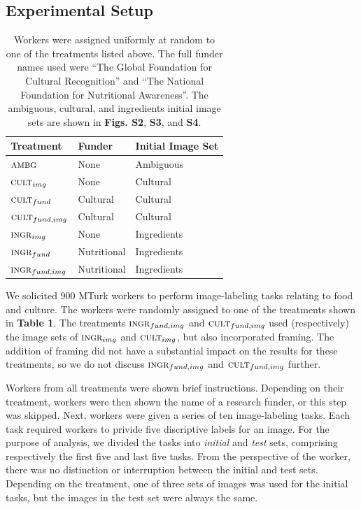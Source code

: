 \documentclass[letterpaper]{article}
\begin{document}
\subsection*{Experimental Setup}
\begin{table}[t]
\centering
	\begin{tabular}{ l  l  l }
		\hline                       
		Treatment & Funder & Initial Image Set	\\ 
		\hline                       
		$\textsc{ambg}$ & None & Ambiguous\\
		$\textsc{cult}_{img}$ & None & Cultural\\
		$\textsc{cult}_{fund}$ & Cultural & Cultural\\
		$\textsc{cult}_{fund,img}$ & Cultural & Cultural\\
		$\textsc{ingr}_{img}$ & None & Ingredients\\
		$\textsc{ingr}_{fund}$ & Nutritional & Ingredients\\
		$\textsc{ingr}_{fund, img}$ & Nutritional & Ingredients\\
		\hline  
	\end{tabular}

	\caption{ \footnotesize{ 
		Workers were assigned uniformly at random to one of the 
		treatments listed above. 
		The full funder names used were 
		``The Global Foundation for Cultural Recognition'' and 
		``The National Foundation for Nutritional Awareness''.  
		The ambiguous, cultural, and ingredients initial image sets are shown 
		in \textbf{Figs. S2}, \textbf{S3}, and \textbf{S4}.
	}}
	\label{table:1}
\end{table}
We solicited 900 MTurk workers to perform image-labeling tasks relating to
food and culture.  The workers were randomly assigned to one of the treatments
shown in \textbf{Table 1}.  The treatments $\textsc{ingr}_{fund,img}$ and 
$\textsc{cult}_{fund,img}$ used (respectively) the image sets of 
$\textsc{ingr}_{img}$ and $\textsc{cult}_{img}$, but also 
incorporated framing.  The addition of framing did not have a substantial
impact on the results for these treatments, so we do not discuss 
$\textsc{ingr}_{fund,img}$ and $\textsc{cult}_{fund,img}$ further.

Workers from all treatments were shown brief instructions.  Depending on 
their treatment, workers were then 
shown the name of a research funder, or this step was skipped.
Next, workers were given a series of ten image-labeling tasks.  Each task 
required workers to privide five discriptive labels for an image.  For the 
purpose of analysis, we divided the tasks
into \textit{initial} and \textit{test} sets, comprising respectively the 
first five and last five tasks.  From the perspective of the worker, there 
was no distinction or interruption between the initial and test sets. 
Depending on the treatment, one of three sets of images was used for the
initial tasks, but the images in the test set were always the same.
\end{document}
